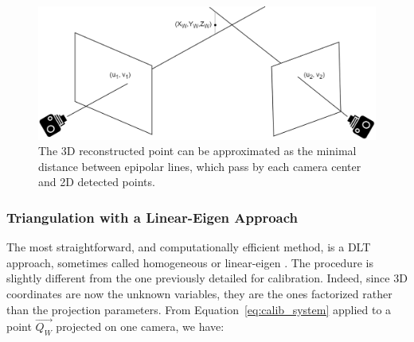 \begin{figure}[hbtp]
	\centering
	\def\svgwidth{1\columnwidth}
	\fontsize{10pt}{10pt}\selectfont
	\includegraphics[width=0.7\linewidth]{"../Chap2/Figures/Triangulation.png"}
	\caption{The 3D reconstructed point can be approximated as the minimal distance between epipolar lines, which pass by each camera center and 2D detected points.}
	\label{fig_triangulation}
\end{figure}

\subsubsection{Triangulation with a Linear-Eigen Approach}  

The most straightforward, and computationally efficient method, is a DLT approach, sometimes called homogeneous or linear-eigen \cite{Hartley1997}. The procedure is slightly different from the one previously detailed for calibration. Indeed, since 3D coordinates are now the unknown variables, they are the ones factorized rather than the projection parameters. From Equation~\ref{eq:calib_system} applied to a point $\overrightarrow{Q_W}$ projected on one camera, we have:

